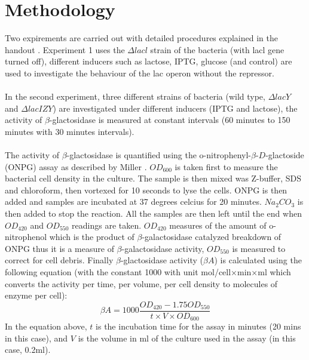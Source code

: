 \documentclass{article}
\begin{document}
\section{Methodology}
Two expirements are carried out with detailed procedures explained in the handout \cite{goossens93}. Experiment 1 uses the $\Delta lacl$ strain of the bacteria (with lacl gene turned off), different inducers such as lactose, IPTG, glucose (and control) are used to investigate the behaviour of the lac operon without the repressor. \\ \\
In the second experiment, three different strains of bacteria (wild type, $\Delta lacY$ and $\Delta lacIZY$) are investigated under different inducers (IPTG and lactose), the activity of $\beta$-glactosidase is measured at constant intervals (60 minutes to 150 minutes with 30 minutes intervals). \\ \\
The activity of $\beta$-glactosidase is quantified using the o-nitrophenyl-$\beta$-$D$-glactoside (ONPG) assay as described by Miller \cite{miller}. $OD_{600}$ is taken first to measure the bacterial cell density in the culture. The sample is then mixed was Z-buffer, SDS and chloroform, then vortexed for 10 seconds to lyse the cells. ONPG is then added and samples are incubated at 37 degrees celcius for 20 minutes. $Na_2CO_3$ is then added to stop the reaction. All the samples are then left until the end when $OD_{420}$ and $OD_{550}$ readings are taken. $OD_{420}$ measures of the amount of o-nitrophenol which is the product of $\beta$-galactosidase catalyzed breakdown of ONPG thus it is a measure of $\beta$-galactosidase activity, $OD_{550}$ is measured to correct for cell debris. Finally $\beta$-glactosidase activity ($\beta A$) is calculated using the following equation (with the constant 1000 with unit mol/cell$\times$min$\times$ml which converts the activity per time, per volume, per cell density to molecules of enzyme per cell):
$$
\beta A = 1000 \dfrac{OD_{420}-1.75OD_{550}}{t\times V\times OD_{600}}
$$
In the equation above, $t$ is the incubation time for the assay in minutes (20 mins in this case), and $V$ is the volume in ml of the culture used in the assay (in this case, 0.2ml).
\end{document}
